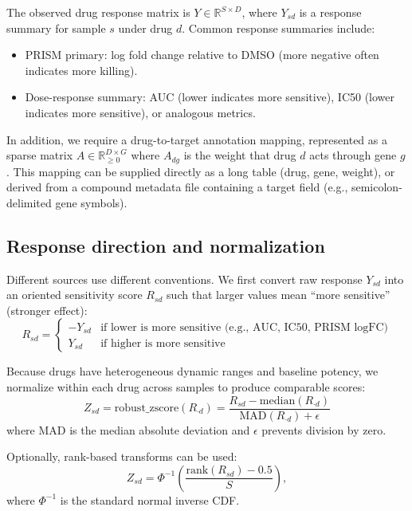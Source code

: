 \documentclass[11pt]{article}
\begin{document}
The observed drug response matrix is $Y \in \mathbb{R}^{S \times D}$, where $Y_{sd}$ is a response summary for sample $s$ under drug $d$.
Common response summaries include:
\begin{itemize}
  \item PRISM primary: log fold change relative to DMSO (more negative often indicates more killing).
  \item Dose-response summary: AUC (lower indicates more sensitive), IC50 (lower indicates more sensitive), or analogous metrics.
\end{itemize}

In addition, we require a drug-to-target annotation mapping, represented as a sparse matrix $A \in \mathbb{R}_{\ge 0}^{D \times G}$ where $A_{dg}$ is the weight that drug $d$ acts through gene $g$.
This mapping can be supplied directly as a long table (drug, gene, weight), or derived from a compound metadata file containing a target field (e.g., semicolon-delimited gene symbols).

\subsection{Response direction and normalization}
Different sources use different conventions. We first convert raw response $Y_{sd}$ into an oriented sensitivity score $R_{sd}$ such that larger values mean ``more sensitive'' (stronger effect):
\begin{equation}
R_{sd} =
\begin{cases}
-Y_{sd} & \text{if lower is more sensitive (e.g., AUC, IC50, PRISM logFC)} \\
Y_{sd} & \text{if higher is more sensitive}
\end{cases}
\end{equation}

Because drugs have heterogeneous dynamic ranges and baseline potency, we normalize within each drug across samples to produce comparable scores:
\begin{equation}
Z_{sd} = \mathrm{robust\_zscore}(R_{\cdot d}) =
\frac{R_{sd} - \mathrm{median}(R_{\cdot d})}{\mathrm{MAD}(R_{\cdot d}) + \epsilon}
\end{equation}
where $\mathrm{MAD}$ is the median absolute deviation and $\epsilon$ prevents division by zero.

Optionally, rank-based transforms can be used:
\begin{equation}
Z_{sd} = \Phi^{-1}\left(\frac{\mathrm{rank}(R_{sd}) - 0.5}{S}\right),
\end{equation}
where $\Phi^{-1}$ is the standard normal inverse CDF.
\end{document}
